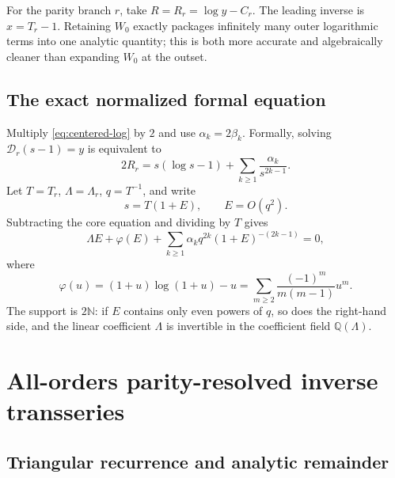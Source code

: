 \documentclass[11pt,a4paper,oneside]{article}
\theoremstyle{plain}
\theoremstyle{definition}
\theoremstyle{remark}
\newcommand{\Q}{\mathbb Q}
\newcommand{\N}{\mathbb N}
\newcommand{\D}{\mathcal D}
\begin{document}
For the parity branch $r$, take $R=R_r=\log y-C_r$.  The leading inverse is
$x=T_r-1$.  Retaining $W_0$ exactly packages infinitely many outer logarithmic
terms into one analytic quantity; this is both more accurate and algebraically
cleaner than expanding $W_0$ at the outset.

\subsection{The exact normalized formal equation}

Multiply \cref{eq:centered-log} by $2$ and use $\alpha_k=2\beta_k$.  Formally,
solving $\D_r(s-1)=y$ is equivalent to
\begin{equation}
 2R_r=s(\log s-1)+\sum_{k\ge1}\frac{\alpha_k}{s^{2k-1}}.
 \label{eq:inverse-forward-formal}
\end{equation}
Let $T=T_r$, $\Lambda=\Lambda_r$, $q=T^{-1}$, and write
\begin{equation}
 s=T(1+E),
 \qquad E=O(q^2).
 \label{eq:relative-displacement}
\end{equation}
Subtracting the core equation and dividing by $T$ gives
\begin{equation}
 \Lambda E+\varphi(E)
 +\sum_{k\ge1}\alpha_kq^{2k}(1+E)^{-(2k-1)}=0,
 \label{eq:normalized-inverse-equation}
\end{equation}
where
\begin{equation}
 \varphi(u)=(1+u)\log(1+u)-u
 =\sum_{m\ge2}\frac{(-1)^m}{m(m-1)}u^m.
 \label{eq:varphi-def}
\end{equation}
The support is $2\N$: if $E$ contains only even powers of $q$, so does the
right-hand side, and the linear coefficient $\Lambda$ is invertible in the
coefficient field $\Q(\Lambda)$.

\section{All-orders parity-resolved inverse transseries}
\label{sec:branch-inverse}

\subsection{Triangular recurrence and analytic remainder}
\end{document}
